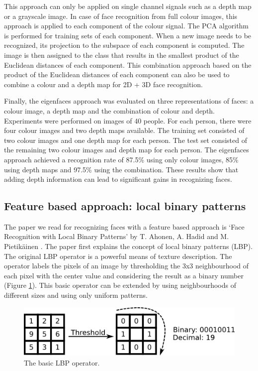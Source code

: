 \documentclass[]{article}
\begin{document}
This approach can only be applied on single channel signals such as a depth map or a grayscale image. In case of face recognition from full colour images, this approach is applied to each component of the colour signal. The PCA algorithm is performed for training sets of each component. When a new image needs to be recognized, its projection to the subspace of each component is computed. The image is then assigned to the class that results in the smallest product of the Euclidean distances of each component. This combination approach based on the product of the Euclidean distances of each component can also be used to combine a colour and a depth map for 2D + 3D face recognition.

Finally, the eigenfaces approach was evaluated on three representations of faces: a colour image, a depth map and the combination of colour and depth. Experiments were performed on images of 40 people. For each person, there were four colour images and two depth maps available. The training set consisted of two colour images and one depth map for each person. The test set consisted of the remaining two colour images and depth map for each person. The eigenfaces approach achieved a recognition rate of 87.5\% using only colour images, 85\% using depth maps and 97.5\% using the combination. These results show that adding depth information can lead to significant gains in recognizing faces.

\subsection{Feature based approach: local binary patterns}
The paper we read for recognizing faces with a feature based approach is `Face Recognition with Local Binary Patterns' by T. Ahonen, A. Hadid and M. Pietikäinen \cite{ahonen2004face}.
The paper first explains the concept of local binary patterns (LBP). The original LBP operator is a powerful means of texture description. The operator labels the pixels of an image by thresholding the 3x3 neighbourhood of each pixel with the center value and considering the result as a binary number (Figure \ref{fig:lbp-explained}). This basic operator can be extended by using neighbourhoods of different sizes and using only uniform patterns.
\begin{figure}
\centering
\includegraphics{lbp_explained.png}
\caption{The basic LBP operator.}
\label{fig:lbp-explained}
\end{figure}
\end{document}
